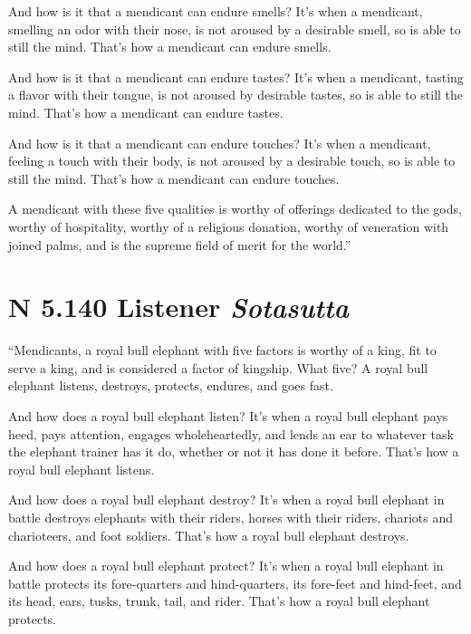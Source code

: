 \documentclass[12pt,openany]{book}%
\newcommand*{\suttatitleacronym}[1]{\smaller[2]{#1}\vspace*{.3em}}
\newcommand*{\suttatitletranslation}[1]{\linebreak{#1}}
\newcommand*{\suttatitleroot}[1]{\linebreak\smaller[2]\itshape{#1}}
\newcommand*{\tocacronym}[1]{\hspace*{-3.3em}{#1}\quad}
\newcommand*{\toctranslation}[1]{#1}
\newcommand*{\tocroot}[1]{(\textit{#1})}
\begin{document}
And how is it that a mendicant can endure smells? It’s when a mendicant, smelling an odor with their nose, is not aroused by a desirable smell, so is able to still the mind. That’s how a mendicant can endure smells. 

And how is it that a mendicant can endure tastes? It’s when a mendicant, tasting a flavor with their tongue, is not aroused by desirable tastes, so is able to still the mind. That’s how a mendicant can endure tastes. 

And how is it that a mendicant can endure touches? It’s when a mendicant, feeling a touch with their body, is not aroused by a desirable touch, so is able to still the mind. That’s how a mendicant can endure touches. 

A mendicant with these five qualities is worthy of offerings dedicated to the gods, worthy of hospitality, worthy of a religious donation, worthy of veneration with joined palms, and is the supreme field of merit for the world.” 

%
\section*{{\suttatitleacronym AN 5.140}{\suttatitletranslation A Listener }{\suttatitleroot Sotasutta}}
\addcontentsline{toc}{section}{\tocacronym{AN 5.140} \toctranslation{A Listener } \tocroot{Sotasutta}}

“Mendicants, a royal bull elephant with five factors is worthy of a king, fit to serve a king, and is considered a factor of kingship. What five? A royal bull elephant listens, destroys, protects, endures, and goes fast. 

And how does a royal bull elephant listen? It’s when a royal bull elephant pays heed, pays attention, engages wholeheartedly, and lends an ear to whatever task the elephant trainer has it do, whether or not it has done it before. That’s how a royal bull elephant listens. 

And how does a royal bull elephant destroy? It’s when a royal bull elephant in battle destroys elephants with their riders, horses with their riders, chariots and charioteers, and foot soldiers. That’s how a royal bull elephant destroys. 

And how does a royal bull elephant protect? It’s when a royal bull elephant in battle protects its fore-quarters and hind-quarters, its fore-feet and hind-feet, and its head, ears, tusks, trunk, tail, and rider. That’s how a royal bull elephant protects. 
\end{document}
